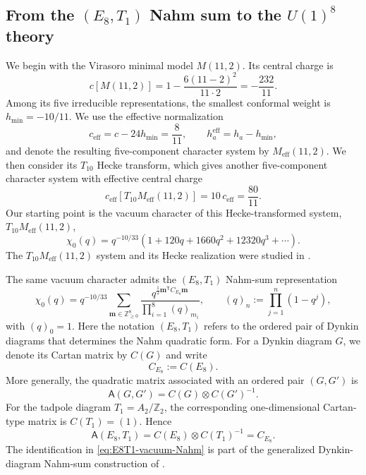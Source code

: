 \documentclass[11pt,a4paper]{article}
\numberwithin{equation}{section}
\begin{document}
\subsection{From the $(E_8,T_1)$ Nahm sum to the $U(1)^8$ theory}
\label{subsec:from-E8T1-to-3d}

We begin with the Virasoro minimal model $M(11,2)$.  Its central charge is
\begin{equation}
  c[M(11,2)]
  =1-\frac{6(11-2)^2}{11\cdot 2}
  =-\frac{232}{11}.
\end{equation}
Among its five irreducible representations, the smallest conformal weight is
$h_{\min}=-10/11$.  We use the effective normalization
\begin{equation}
  c_{\mathrm{eff}}=c-24h_{\min}=\frac{8}{11},
  \qquad
  h_a^{\mathrm{eff}}=h_a-h_{\min},
  \label{eq:Meff-definition}
\end{equation}
and denote the resulting five-component character system by
$M_{\mathrm{eff}}(11,2)$.  We then consider its $T_{10}$ Hecke transform,
which gives another five-component character system with effective central charge
\begin{equation}
  c_{\mathrm{eff}}\!\left[T_{10}M_{\mathrm{eff}}(11,2)\right]
  =10\,c_{\mathrm{eff}}
  =\frac{80}{11}.
\end{equation}
Our starting point is the vacuum character of this Hecke-transformed system,
$T_{10}M_{\mathrm{eff}}(11,2)$,
\begin{equation}
  \chi_0(q)
  =q^{-10/33}
  \left(
    1+120q+1660q^2+12320q^3+\cdots
  \right).
  \label{eq:T10-vacuum-expansion}
\end{equation}
The $T_{10}M_{\mathrm{eff}}(11,2)$ system and its Hecke realization were studied in
\cite{DuanLeeSun:2022Hecke}.

The same vacuum character admits the $(E_8,T_1)$ Nahm-sum representation
\begin{equation}
  \chi_0(q)
  =q^{-10/33}
  \sum_{\boldsymbol m\in\mathbb Z_{\geq0}^{8}}
  \frac{
    q^{\frac12\boldsymbol m^{\mathsf T}C_{E_8}\boldsymbol m}
  }{
    \prod_{i=1}^{8}(q)_{m_i}
  },
  \qquad
  (q)_n:=\prod_{j=1}^{n}(1-q^j),
  \label{eq:E8T1-vacuum-Nahm}
\end{equation}
with $(q)_0=1$.  Here the notation $(E_8,T_1)$ refers to the ordered pair of Dynkin diagrams that determines the Nahm quadratic form.  For a Dynkin diagram $G$, we denote its Cartan matrix by $C(G)$ and write
\begin{equation}
  C_{E_8}:=C(E_8).
\end{equation}
More generally, the quadratic matrix associated with an ordered pair $(G,G')$ is
\begin{equation}
  \mathsf A(G,G')=C(G)\otimes C(G')^{-1}.
\end{equation}
For the tadpole diagram $T_1=A_2/\mathbb Z_2$, the corresponding one-dimensional Cartan-type matrix is $C(T_1)=(1)$.  Hence
\begin{equation}
  \mathsf A(E_8,T_1)
  =C(E_8)\otimes C(T_1)^{-1}
  =C_{E_8}.
  \label{eq:E8T1-quadratic-form}
\end{equation}
The identification in \eqref{eq:E8T1-vacuum-Nahm} is part of the generalized Dynkin-diagram Nahm-sum construction of
\cite{SunWang:2026Dynkin}.
\end{document}
